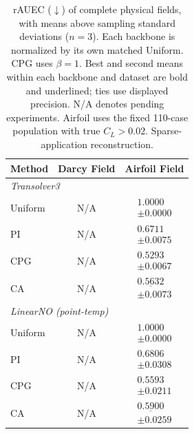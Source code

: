 \begin{table}[t]
\centering
\small
\caption{rAUEC ($\downarrow$) of complete physical fields, with means above sampling standard deviations ($n=3$). Each backbone is normalized by its own matched Uniform. CPG uses $\beta=1$. Best and second means within each backbone and dataset are bold and underlined; ties use displayed precision. N/A denotes pending experiments. Airfoil uses the fixed 110-case population with true $C_L>0.02$. Sparse-application reconstruction.}
\label{tab:linearno-standard-new}
\setlength{\tabcolsep}{8pt}
\renewcommand{\arraystretch}{1.15}
\begin{tabular}{lcc}
\toprule
Method & Darcy Field & Airfoil Field \\
\midrule
\multicolumn{3}{l}{\textit{Transolver3}} \\
Uniform & N/A & $\begin{gathered}1.0000\\[-2pt]\pm 0.0000\end{gathered}$ \\
PI & N/A & $\begin{gathered}0.6711\\[-2pt]\pm 0.0075\end{gathered}$ \\
CPG & N/A & $\begin{gathered}\mathbf{0.5293}\\[-2pt]\pm 0.0067\end{gathered}$ \\
CA & N/A & $\begin{gathered}\underline{0.5632}\\[-2pt]\pm 0.0073\end{gathered}$ \\
\midrule
\multicolumn{3}{l}{\textit{LinearNO (point-temp)}} \\
Uniform & N/A & $\begin{gathered}1.0000\\[-2pt]\pm 0.0000\end{gathered}$ \\
PI & N/A & $\begin{gathered}0.6806\\[-2pt]\pm 0.0308\end{gathered}$ \\
CPG & N/A & $\begin{gathered}\mathbf{0.5593}\\[-2pt]\pm 0.0211\end{gathered}$ \\
CA & N/A & $\begin{gathered}\underline{0.5900}\\[-2pt]\pm 0.0259\end{gathered}$ \\
\bottomrule
\end{tabular}
\end{table}
